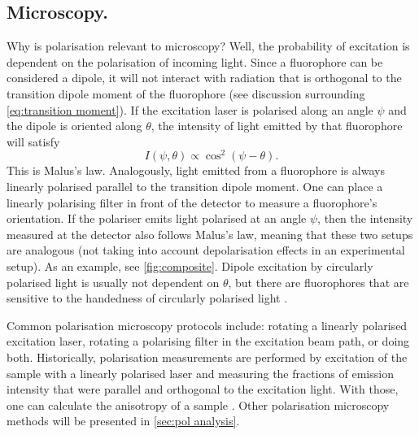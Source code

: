 \subsection{Microscopy.} Why is polarisation relevant to microscopy? Well, the probability of excitation is dependent on the polarisation of incoming light. Since a fluorophore can be considered a dipole, it will not interact with radiation that is orthogonal to the transition dipole moment of the fluorophore (see discussion surrounding \autoref{eq:transition moment}). If the excitation laser is polarised along an angle $ \psi$ and the dipole is oriented along $ \theta $, the intensity of light emitted by that fluorophore will satisfy 
\begin{equation}
	\label{eq:malus}
	I(\psi, \theta) \propto \cos^2(\psi-\theta).
\end{equation}
This is Malus's law. Analogously, light emitted from a fluorophore is always linearly polarised parallel to the transition dipole moment. One can place a linearly polarising filter in front of the detector to measure a fluorophore's orientation. If the polariser emits light polarised at an angle $ \psi$, then the intensity measured at the detector also follows Malus's law, meaning that these two setups are analogous (not taking into account depolarisation effects in an experimental setup). As an example, see \autoref{fig:composite}. Dipole excitation by circularly polarised light is usually not dependent on $ \theta $, but there are fluorophores that are sensitive to the handedness of circularly polarised light \cite{Takaishi2019}.

Common polarisation microscopy protocols include: rotating a linearly polarised excitation laser, rotating a polarising filter in the excitation beam path, or doing both. Historically, polarisation measurements are performed by excitation of the sample with a linearly polarised laser and measuring the fractions of emission intensity that were parallel and orthogonal to the excitation light. With those, one can calculate the anisotropy of a sample \cite{Camacho2019}. Other polarisation microscopy methods will be presented in \autoref{sec:pol analysis}.

